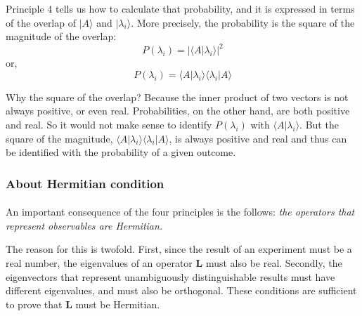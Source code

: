 \documentclass[a4paper,10pt]{article}
\begin{document}
Principle 4 tells us how to calculate that probability, and it is expressed in terms of the overlap of $|A\rangle$ and $|\lambda_i\rangle$. More precisely, the probability is the square of the magnitude of the overlap:
$$P(\lambda_i) = |\langle A|\lambda_i\rangle|^2$$
or,
$$P(\lambda_i) = \langle A|\lambda_i\rangle\langle\lambda_i|A\rangle$$

Why the square of the overlap? Because the inner product of two vectors is not always positive, or even real. Probabilities, on the other hand, are both positive and real. So it would not make sense to identify $P(\lambda_i)$ with $\langle A|\lambda_i\rangle$. But the square of the magnitude, $\langle A|\lambda_i\rangle\langle\lambda_i|A\rangle$, is always positive and real and thus can be identified with the probability of a given outcome.

\subsubsection{About Hermitian condition}
\paragraph{} An important consequence of the four principles is the follows: \textit{the operators that represent observables are Hermitian.}

The reason for this is twofold. First, since the result of an experiment must be a real number, the eigenvalues of an operator $\mathbf{L}$ must also be real. Secondly, the eigenvectors that represent unambiguously distinguishable results must have different eigenvalues, and must also be orthogonal. These conditions are sufficient to prove that $\mathbf{L}$ must be Hermitian.

\end{document}
